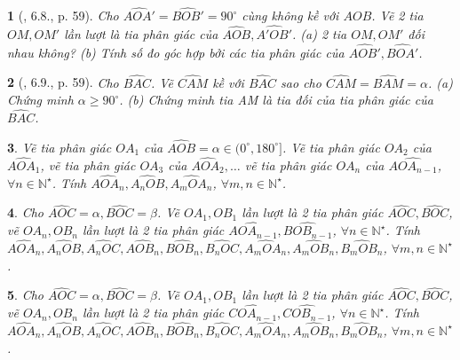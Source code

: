 \documentclass{article}
\newtheorem{baitoan}{}
\begin{document}
\begin{baitoan}[\cite{TLCT_THCS_Toan_6_hinh_hoc}, 6.8., p. 59]
	Cho $\widehat{AOA'} = \widehat{BOB'} = 90^\circ$ cùng không kề với $AOB$. Vẽ 2 tia $OM,OM'$ lần lượt là tia phân giác của $\widehat{AOB},\widehat{A'OB'}$. (a) 2 tia $OM,OM'$ đối nhau không? (b) Tính số đo góc hợp bởi các tia phân giác của $\widehat{AOB'},\widehat{BOA'}$.
\end{baitoan}

\begin{baitoan}[\cite{TLCT_THCS_Toan_6_hinh_hoc}, 6.9., p. 59]
	Cho $\widehat{BAC}$. Vẽ $\widehat{CAM}$ kề với $\widehat{BAC}$ sao cho $\widehat{CAM} = \widehat{BAM} = \alpha$. (a) Chứng minh $\alpha\ge90^\circ$. (b) Chứng minh tia AM là tia đối của tia phân giác của $\widehat{BAC}$.
\end{baitoan}

\begin{baitoan}
	Vẽ tia phân giác $OA_1$ của  $\widehat{AOB} = \alpha\in(0^\circ,180^\circ]$. Vẽ tia phân giác $OA_2$ của $\widehat{AOA_1}$, vẽ tia phân giác $OA_3$ của $\widehat{AOA_2},\ldots$ vẽ tia phân giác $OA_n$ của $\widehat{AOA_{n-1}}$, $\forall n\in\mathbb{N}^\star$. Tính $\widehat{AOA_n},\widehat{A_nOB},\widehat{A_mOA_n}$, $\forall m,n\in\mathbb{N}^\star$.
\end{baitoan}

\begin{baitoan}
	Cho $\widehat{AOC} = \alpha,\widehat{BOC} = \beta$. Vẽ $OA_1,OB_1$ lần lượt là 2 tia phân giác $\widehat{AOC},\widehat{BOC}$, vẽ $OA_n,OB_n$ lần lượt là 2 tia phân giác $\widehat{AOA_{n-1}},\widehat{BOB_{n-1}}$, $\forall n\in\mathbb{N}^\star$. Tính $\widehat{AOA_n},\widehat{A_nOB},\widehat{A_nOC},\widehat{AOB_n},\widehat{BOB_n},\widehat{B_nOC},\widehat{A_mOA_n},\widehat{A_mOB_n},\widehat{B_mOB_n}$, $\forall m,n\in\mathbb{N}^\star$.
\end{baitoan}

\begin{baitoan}
	Cho $\widehat{AOC} = \alpha,\widehat{BOC} = \beta$. Vẽ $OA_1,OB_1$ lần lượt là 2 tia phân giác $\widehat{AOC},\widehat{BOC}$, vẽ $OA_n,OB_n$ lần lượt là 2 tia phân giác $\widehat{COA_{n-1}},\widehat{COB_{n-1}}$, $\forall n\in\mathbb{N}^\star$. Tính $\widehat{AOA_n},\widehat{A_nOB},\widehat{A_nOC},\widehat{AOB_n},\widehat{BOB_n},\widehat{B_nOC},\widehat{A_mOA_n},\widehat{A_mOB_n},\widehat{B_mOB_n}$, $\forall m,n\in\mathbb{N}^\star$.
\end{baitoan}

\end{document}
